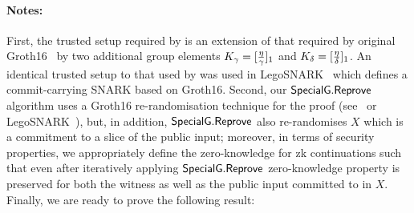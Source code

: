 \noindent \paragraph{Notes:} First, the trusted setup required by \SpecialG is 
an extension of that required by original Groth16~\cite{Groth16} by two additional 
group elements $K_{\gamma} = [\frac{\eta}{\gamma}]_1$ and $K_{\delta} = [\frac{\eta}{\delta}]_1$. 
An identical trusted setup to that used by \SpecialG was used in LegoSNARK~\cite[Fig.~22]{LegoSNARK} which defines 
a commit-carrying SNARK based on Groth16. Second, our ${\mathsf{SpecialG}}.{\mathsf{Reprove}}$ algorithm uses a Groth16 re-randomisation 
technique for the proof (see~\cite[Fig.~1]{RandomizationGroth16} or LegoSNARK~\cite[Fig.~22]{LegoSNARK}), 
but, in addition, ${\mathsf{SpecialG}}.{\mathsf{Reprove}}$ also re-randomises $X$ which is a commitment to a slice of the public input; moreover, in terms of security 
properties, we appropriately define the zero-knowledge for zk continuations such that even after iteratively applying 
${\mathsf{SpecialG}}.{\mathsf{Reprove}}$ zero-knowledge property is preserved for both the witness as well as the public input committed to in $X$.  \\


\noindent Finally, we are ready to prove the following result:

